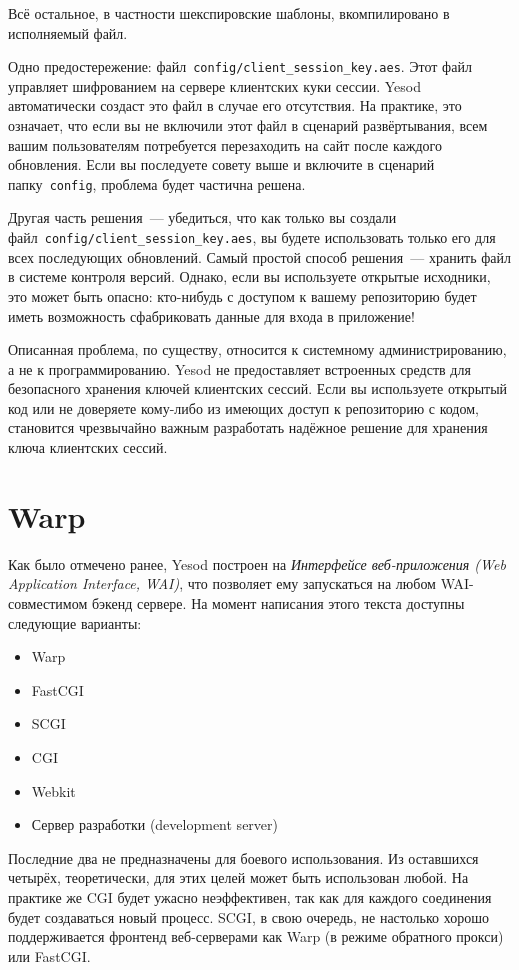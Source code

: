 Всё остальное, в частности шекспировские шаблоны, вкомпилировано в исполняемый
файл.

Одно предостережение: файл~\texttt{config/client\_session\_key.aes}. Этот файл
управляет шифрованием на сервере клиентских куки сессии. Yesod автоматически
создаст это файл в случае его отсутствия. На практике, это означает, что если
вы не включили этот файл в сценарий развёртывания, всем вашим пользователям
потребуется перезаходить на сайт после каждого обновления. Если вы последуете
совету выше и включите в сценарий папку~\texttt{config}, проблема будет
частична решена.

Другая часть решения~--- убедиться, что как только вы создали
файл~\texttt{config/client\_session\_key.aes}, вы будете использовать только его
для всех последующих обновлений. Самый простой способ решения~--- хранить файл
в системе контроля версий. Однако, если вы используете открытые исходники, это
может быть опасно: кто-нибудь с доступом к вашему репозиторию будет иметь
возможность сфабриковать данные для входа в приложение!

Описанная проблема, по существу, относится к системному администрированию, а не
к программированию. Yesod не предоставляет встроенных средств для безопасного
хранения ключей клиентских сессий. Если вы используете открытый код или не
доверяете кому-либо из имеющих доступ к репозиторию с кодом, становится
чрезвычайно важным разработать надёжное решение для хранения ключа клиентских
сессий.

\section{Warp}
Как было отмечено ранее, Yesod построен на \emph{Интерфейсе веб-приложения (Web
    Application Interface, WAI)}, что позволяет ему запускаться на любом
WAI-совместимом бэкенд сервере. На момент написания этого текста доступны
следующие варианты:
\begin{itemize}
    \item Warp
    \item FastCGI
    \item SCGI
    \item CGI
    \item Webkit
    \item Сервер разработки (development server)
\end{itemize}

Последние два не предназначены для боевого %
использования. Из оставшихся четырёх, теоретически, для этих целей может быть использован любой. На практике же CGI будет ужасно неэффективен, так как для каждого соединения будет создаваться новый процесс. SCGI, в свою очередь, не настолько хорошо поддерживается фронтенд веб-серверами как Warp (в режиме обратного прокси) или FastCGI.

